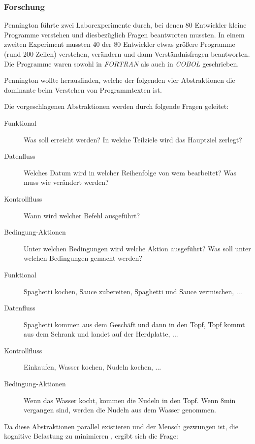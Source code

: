 \subsubsection{Forschung}

Pennington führte zwei Laborexperimente durch, bei denen 80 Entwickler kleine Programme verstehen und diesbezüglich Fragen beantworten mussten. In einem zweiten Experiment mussten 40 der 80 Entwickler etwas größere Programme (rund 200 Zeilen) verstehen, verändern und dann Verständnisfragen beantworten. Die Programme waren sowohl in \textit{FORTRAN} als auch in \textit{COBOL} geschrieben.

Pennington wollte herausfinden, welche der folgenden vier Abstraktionen die dominante beim Verstehen von Programmtexten ist.

Die vorgeschlagenen Abstraktionen werden durch folgende Fragen geleitet:
\begin{description}
\item[Funktional] Was soll erreicht werden? In welche Teilziele wird das Hauptziel zerlegt?
\item[Datenfluss] Welches Datum wird in welcher Reihenfolge von wem bearbeitet? Was muss wie verändert werden?
\item[Kontrollfluss] Wann wird welcher Befehl ausgeführt?
\item[Bedingung-Aktionen] Unter welchen Bedingungen wird welche Aktion ausgeführt? Was soll unter welchen Bedingungen gemacht werden?
\end{description}

\begin{furtherreading}[frametitle={Beispiel: Mahlzeit Spaghetti zubereiten}]
\label{subsec:PenningtonSpaghetti}
\begin{description}
\item[Funktional] Spaghetti kochen, Sauce zubereiten, Spaghetti und Sauce vermischen, ...
\item[Datenfluss] Spaghetti kommen aus dem Geschäft und dann in den Topf, Topf kommt aus dem Schrank und landet auf der Herdplatte, ...
\item[Kontrollfluss] Einkaufen, Wasser kochen, Nudeln kochen, ...
\item[Bedingung-Aktionen] Wenn das Wasser kocht, kommen die Nudeln in den Topf. Wenn 8min vergangen sind, werden die Nudeln aus dem Wasser genommen.
\end{description}
\end{furtherreading}


Da diese Abstraktionen parallel existieren und der Mensch gezwungen ist, die kognitive Belastung zu minimieren \citep{Miller:1956dz}, ergibt sich die Frage:

